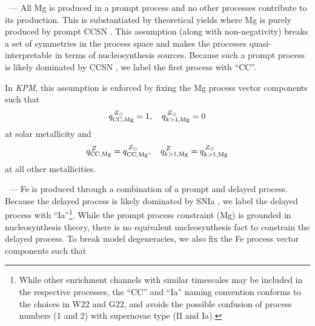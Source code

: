 \documentclass[modern]{aastex631}
\newcommand{\name}{\textsl{KPM}}
\renewcommand{\paragraph}[1]{\bigskip\par\noindent{\textbf{#1}}~---}
\begin{document}
\paragraph{4. Mg production}
All Mg is produced in a prompt process and no other processes contribute to its production.
This is substantiated by theoretical yields where Mg is purely produced by prompt CCSN \citep[e.g.,][]{anderson2019, rybizki2017}.
This assumption (along with non-negativity) breaks a set of symmetries in the process space and makes the processes quasi-interpretable in terms of nucleosynthesis sources.
Because such a prompt process is likely dominated by CCSN \citep[e.g.,][]{andrews2017}, we label the first process with ``CC''. 

In \name{}, this assumption is enforced by fixing the Mg process vector components such that
\begin{equation}\label{eq:qcc_mg_solar}
    q_{{\rm CC, Mg}}^{\,Z_{\odot}} = 1, \quad q_{k>1,{\rm Mg}}^{\,Z_{\odot}} = 0
\end{equation}
at solar metallicity and 
\begin{equation}\label{eq:qcc_mg_z}
    q_{{\rm CC, Mg}}^{\,Z} = q_{{\rm CC, Mg}}^{\,Z_{\odot}}, \quad q_{k>1, {\rm Mg}}^{\,Z} = q_{k>1, {\rm Mg}}^{\,Z_{\odot}}
\end{equation}
at all other metallicities.

\paragraph{5. Fe production}
Fe is produced through a combination of a prompt and delayed process. Because the delayed process is likely dominated by SNIa \citep[e.g.,][]{andrews2017}, we label the delayed process with ``Ia''\footnote{While other enrichment channels with similar timescales may be included in the respective processes, the ``CC'' and ``Ia'' naming convention conforms to the choices in W22 and G22, and avoids the possible confusion of process numbers (1 and 2) with supernovae type (II and Ia).}.
While the prompt process constraint (Mg) is grounded in nucleosynthesis theory, there is no equivalent nucleosynthesis fact to constrain the delayed process.
To break model degeneracies, we also fix the Fe process vector components such that 
\end{document}
